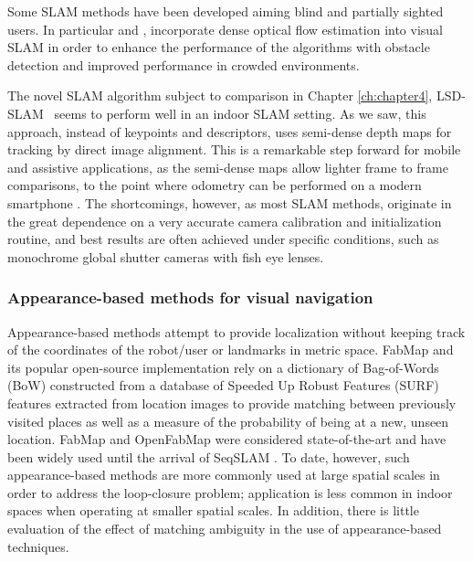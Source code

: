 Some SLAM methods have been developed aiming blind and partially sighted users. In particular \cite{alcantarilla2010visual} and \cite{alcantarilla2012combining}, incorporate dense optical flow estimation into visual SLAM in order to enhance the performance of the algorithms with obstacle detection and improved performance in crowded environments. 

The novel SLAM algorithm subject to comparison in Chapter \ref{ch:chapter4}, LSD-SLAM~\citep{engel14eccv} seems to perform well in an indoor SLAM setting. As we saw, this approach, instead of keypoints and descriptors, uses semi-dense depth maps for tracking by direct image alignment. This is a remarkable step forward for mobile and assistive applications, as the semi-dense maps allow lighter frame to frame comparisons, to the point where odometry can be performed on a modern smartphone \citep{schoeps14ismar}. The shortcomings, however, as most SLAM methods, originate in the great dependence on a very accurate camera calibration and initialization routine, and best results are often achieved under specific conditions, such as monochrome global shutter cameras with fish eye lenses.

\subsubsection{Appearance-based methods for visual navigation}
Appearance-based methods attempt to provide localization without keeping track of the coordinates of the robot/user or landmarks in metric space. FabMap \citep{cumminsFabMap2010} and its popular open-source implementation \citep{OpenFabMap2011} rely on a dictionary of Bag-of-Words (BoW) constructed from a database of Speeded Up Robust Features (SURF) features extracted from location images to provide matching between previously visited places as well as a measure of the probability of being at a new, unseen location. FabMap and OpenFabMap were considered state-of-the-art and have been widely used until the arrival of SeqSLAM \cite{SeqSLAM}. To date, however, such appearance-based methods are more commonly used at large spatial scales in order to address the loop-closure problem; application is less common  in indoor spaces when operating at smaller spatial scales. In addition, there is little evaluation of the effect of matching ambiguity in the use of appearance-based techniques. 


